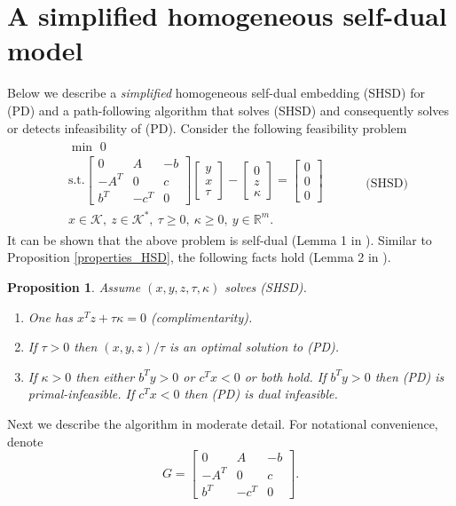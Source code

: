 \documentclass[10pt]{article}
\theoremstyle{definition}
\theoremstyle{plain}
\newtheorem{prop}{Proposition}
\begin{document}
\section{A simplified homogeneous self-dual model}
Below we describe a \textit{simplified} homogeneous self-dual embedding (SHSD) for (PD) and a path-following algorithm that solves (SHSD) and consequently solves or detects infeasibility of (PD). Consider the following feasibility problem
\begin{align*}
\begin{split}
& \min \,\, 0 \\
& \text{s.t.} \begin{bmatrix}
0 & A & -b \\ 
-A^T & 0 & c \\
b^T & -c^T& 0 
\end{bmatrix}
\begin{bmatrix}
y \\ x \\ \tau
\end{bmatrix} - 
\begin{bmatrix}
0 \\ z \\ \kappa 
\end{bmatrix} = 
\begin{bmatrix}
0 \\ 0 \\ 0
\end{bmatrix}\\
& x \in \mathcal{K},\ z \in \mathcal{K}^*,\ \tau \geq 0,\ \kappa\geq 0,\ y \in \mathbb{R}^m.
\end{split} \quad \quad \quad \text{(SHSD)}
\end{align*}
It can be shown that the above problem is self-dual (Lemma 1 in \cite{Skarjaa_and_Ye}). Similar to Proposition \ref{properties_HSD}, the following facts hold (Lemma 2 in \cite{Skarjaa_and_Ye}).
\begin{prop}\label{properties_SHSD}
Assume $(x,y,z,\tau,\kappa)$ solves (SHSD).
\begin{enumerate}
		\item One has $x^T z + \tau\kappa = 0$ (complimentarity).
		\item If $\tau>0$ then $(x,y,z)/\tau$ is an optimal solution to (PD). 
		\item If $\kappa>0$ then either $b^Ty>0$ or $c^Tx<0$ or both hold. 
		\subitem If $b^T y>0$ then (PD) is primal-infeasible.
		\subitem If $c^T x < 0$ then (PD) is dual infeasible.
	\end{enumerate}
\end{prop}
Next we describe the algorithm in moderate detail. For notational convenience, denote 
\[G = \begin{bmatrix}
0 & A & -b \\ 
-A^T & 0 & c \\
b^T & -c^T& 0 
\end{bmatrix}.\]
\end{document}
